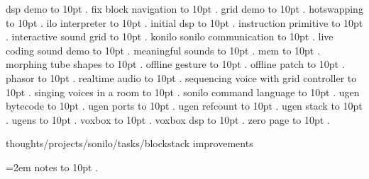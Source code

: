\smallskip
dsp demo \leaders\hbox to 10pt {\hss.\hss}  \hfill {}
\smallskip
fix block navigation \leaders\hbox to 10pt {\hss.\hss}  \hfill {}
\smallskip
grid demo \leaders\hbox to 10pt {\hss.\hss}  \hfill {}
\smallskip
hotswapping \leaders\hbox to 10pt {\hss.\hss}  \hfill {}
\smallskip
ilo interpreter \leaders\hbox to 10pt {\hss.\hss}  \hfill {}
\smallskip
initial dsp \leaders\hbox to 10pt {\hss.\hss}  \hfill {}
\smallskip
instruction primitive \leaders\hbox to 10pt {\hss.\hss}  \hfill {}
\smallskip
interactive sound grid \leaders\hbox to 10pt {\hss.\hss}  \hfill {}
\smallskip
konilo sonilo communication \leaders\hbox to 10pt {\hss.\hss}  \hfill {}
\smallskip
live coding sound demo \leaders\hbox to 10pt {\hss.\hss}  \hfill {}
\smallskip
meaningful sounds \leaders\hbox to 10pt {\hss.\hss}  \hfill {}
\smallskip
mem \leaders\hbox to 10pt {\hss.\hss}  \hfill {}
\smallskip
morphing tube shapes \leaders\hbox to 10pt {\hss.\hss}  \hfill {}
\smallskip
offline gesture \leaders\hbox to 10pt {\hss.\hss}  \hfill {}
\smallskip
offline patch \leaders\hbox to 10pt {\hss.\hss}  \hfill {}
\smallskip
phasor \leaders\hbox to 10pt {\hss.\hss}  \hfill {}
\smallskip
realtime audio \leaders\hbox to 10pt {\hss.\hss}  \hfill {}
\smallskip
sequencing voice with grid controller \leaders\hbox to 10pt {\hss.\hss}  \hfill {}
\smallskip
singing voices in a room \leaders\hbox to 10pt {\hss.\hss}  \hfill {}
\smallskip
sonilo command language \leaders\hbox to 10pt {\hss.\hss}  \hfill {}
\smallskip
ugen bytecode \leaders\hbox to 10pt {\hss.\hss}  \hfill {}
\smallskip
ugen ports \leaders\hbox to 10pt {\hss.\hss}  \hfill {}
\smallskip
ugen refcount \leaders\hbox to 10pt {\hss.\hss}  \hfill {}
\smallskip
ugen stack \leaders\hbox to 10pt {\hss.\hss}  \hfill {}
\smallskip
ugens \leaders\hbox to 10pt {\hss.\hss}  \hfill {}
\smallskip
voxbox \leaders\hbox to 10pt {\hss.\hss}  \hfill {}
\smallskip
voxbox dsp \leaders\hbox to 10pt {\hss.\hss}  \hfill {}
\smallskip
zero page \leaders\hbox to 10pt {\hss.\hss}  \hfill {}
\smallskip
\par\endgroup
\bigskip
{}
thoughts/projects/sonilo/tasks/blockstack improvements
\par\begingroup
\leftskip=2em
\smallskip
notes \leaders\hbox to 10pt {\hss.\hss}  \hfill {}
\smallskip
\medskip
\par\endgroup

